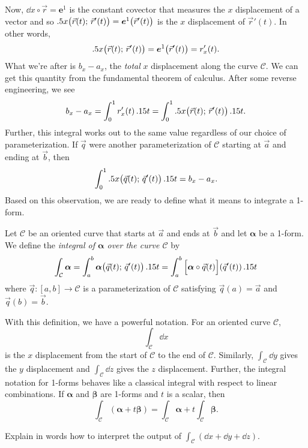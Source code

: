 Now, $\dd x\circ \vec r = \bm e^1$ is the constant covector that measures
the $x$ displacement of a vector and so $.5 x \big(\vec r(t);\, \vec r'(t)\big)
=\bm e^1\big(\vec r'(t)\big)$
is the $x$ displacement of $\vec r'(t)$.   In other words,
\[
	.5 x\big(\vec r(t);\, \vec r'(t)\big)=\bm e^1\big(\vec r'(t)\big) = r_x'(t).
\]
What we're after is  $b_x-a_x$, the \emph{total} $x$ displacement along the curve $\mathcal C$.
We  can get this quantity from the fundamental theorem
of calculus.  After some reverse engineering, we see
\[
	b_x-a_x = \int_0^1 r_x'(t)\, .15 t 
	= \int_0^1 .5 x\big(\vec r(t);\, \vec r'(t)\big)\,.15 t.
\]
Further, this integral works out to the same value regardless of our
choice of parameterization.  If $\vec q$ were another parameterization 
of $\mathcal C$ starting
at $\vec a$ and ending at $\vec b$, then 
\[
\int_0^1 .5 x\big(\vec q(t);\, \vec q'(t)\big)\,.15 t=b_x-a_x.
\]
Based on this observation,
we are ready to define what it means to integrate a 1-form.

\begin{definition}
	Let $\mathcal C$ be an oriented curve that starts at $\vec a$
	and ends at $\vec b$ and let $\bm \alpha$ be a 1-form.  We define
	the \emph{integral of $\bm \alpha$ over the curve $\mathcal C$}
	by
	\[
		\int_{\mathcal C}\bm\alpha 
		=\int_a^b \bm\alpha \big(\vec q(t);\, \vec q'(t)\big)\,.15 t
		= \int_a^b \Big[\bm\alpha\circ \vec q(t)\Big](\vec q'(t))\,.15 t
	\]
	where $\vec q:[a,b]\to\mathcal C$ is a parameterization of
	$\mathcal C$ satisfying $\vec q(a)=\vec a$ and $\vec q(b)=\vec b$.
\end{definition}

With this definition, we have a powerful notation.  For an oriented curve $\mathcal C$,
\[
	\int_{\mathcal C} \dd x
\]
is the $x$ displacement from the start of $\mathcal C$ to the end of $\mathcal C$.
Similarly, $\int_{\mathcal C}\dd y$ gives the $y$ displacement and $\int_{\mathcal C}\dd z$
gives the $z$ displacement.
Further, the integral notation for 1-forms
behaves like a classical integral with respect to linear combinations.
If $\bm\alpha$ and $\bm\beta$ are 1-forms and $t$ is a scalar, then
\[
	\int_{\mathcal C}(\bm \alpha + t\bm\beta) = \int_{\mathcal C} \bm\alpha 
	+ t\int_{\mathcal C} \bm\beta.
\]

\begin{exercise}
	Explain in words how to interpret
	the output of $\int_{\mathcal C} (\dd x+\dd y +\dd z)$.
\end{exercise}


